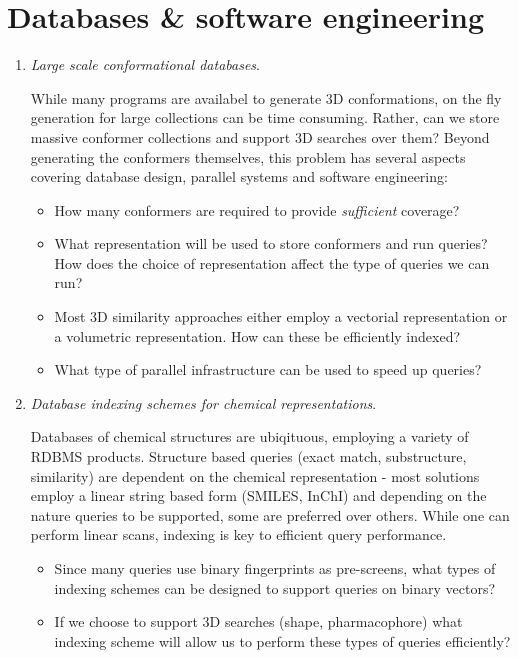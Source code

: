 \documentclass{sig-alternate}
\begin{document}
\section*{Databases \& software engineering}
\begin{enumerate}
\item \emph{Large scale conformational databases}.

  While many programs are availabel to generate 3D conformations, on
  the fly generation for large collections can be time
  consuming. Rather, can we store massive conformer collections and
  support 3D searches over them? Beyond generating the conformers
  themselves, this problem has several aspects covering database
  design, parallel systems and software engineering:
  \begin{itemize}
  \item How many conformers are required to provide \emph{sufficient} coverage?
  \item What representation will be used to store conformers and run
    queries? How does the choice of representation affect the type of
    queries we can run?
  \item Most 3D similarity approaches either employ a vectorial
    representation or a volumetric representation. How can these be
    efficiently indexed?
  \item What type of parallel infrastructure can be used to speed up queries?
  \end{itemize}


\item \emph{Database indexing schemes for chemical representations}. 

Databases of chemical structures are ubiqituous, employing a variety
of RDBMS products. Structure based queries (exact match, substructure,
similarity) are dependent on the chemical representation - most
solutions employ a linear string based form (SMILES, InChI) and
depending on the nature queries to be supported, some are preferred
over others. While one can perform linear scans, indexing is key to
efficient query performance.
\begin{itemize}
\item  Since many queries use binary fingerprints as pre-screens, what
  types of indexing schemes can be designed to support queries on
  binary vectors?
\item If we choose to support 3D searches (shape, pharmacophore) what
  indexing scheme will allow us to perform these types of queries
  efficiently?
\end{itemize}


\end{enumerate}
\end{document}
